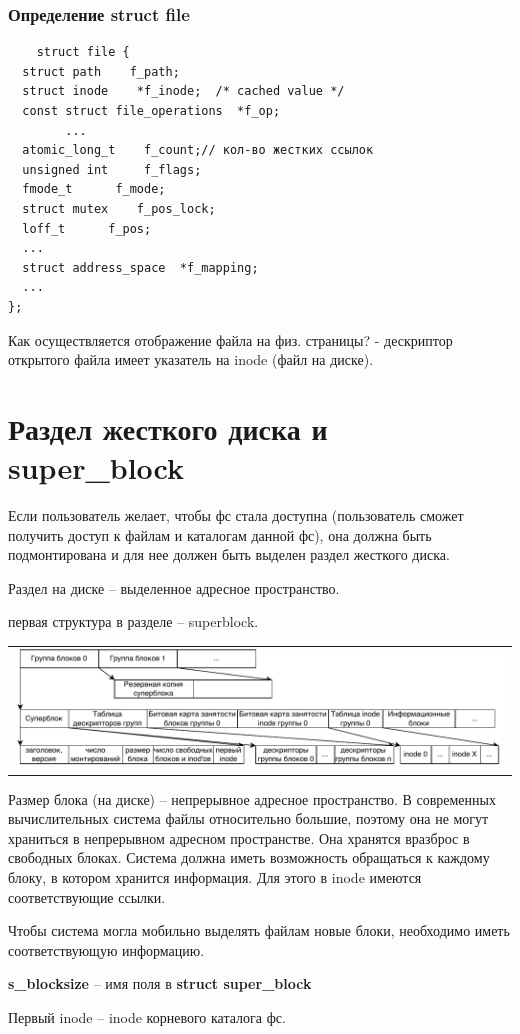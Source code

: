 \subsubsection{Определение struct file}
\begin{lstlisting}
    struct file {
  struct path    f_path;
  struct inode    *f_inode;  /* cached value */
  const struct file_operations  *f_op;
        ...
  atomic_long_t    f_count;// кол-во жестких ссылок
  unsigned int     f_flags;
  fmode_t      f_mode;
  struct mutex    f_pos_lock;
  loff_t      f_pos;
  ...
  struct address_space  *f_mapping;
  ...
};
\end{lstlisting}
Как осуществляется отображение файла на физ. страницы? - дескриптор открытого файла имеет указатель на inode (файл на диске).

\section{Раздел жесткого диска и super\_block}
\par Если пользователь желает, чтобы фс стала доступна (пользователь сможет получить доступ к файлам и каталогам данной фс), она должна быть подмонтирована и для нее должен быть выделен раздел жесткого диска.
\par Раздел на диске -- выделенное адресное пространство.
\par первая структура в разделе -- superblock.

\begin{table}[h!]
  \centering
  \begin{tabular}{p{1\linewidth}}
    \centering
    \includegraphics[width=1\linewidth]{./images/partition.pdf}
  \end{tabular}
\end{table}

\par Размер блока (на диске) -- непрерывное адресное пространство. В современных вычислительных система файлы относительно большие, поэтому она не могут храниться в непрерывном адресном пространстве. Она хранятся вразброс в свободных блоках. Система должна иметь возможность обращаться к каждому блоку, в котором хранится информация. Для этого в inode имеются соответствующие ссылки.
\par Чтобы система могла мобильно выделять файлам новые блоки, необходимо иметь соответствующую информацию.
\par \textbf{s\_blocksize} -- имя поля в \textbf{struct super\_block}
\par Первый inode -- inode корневого каталога фс.

